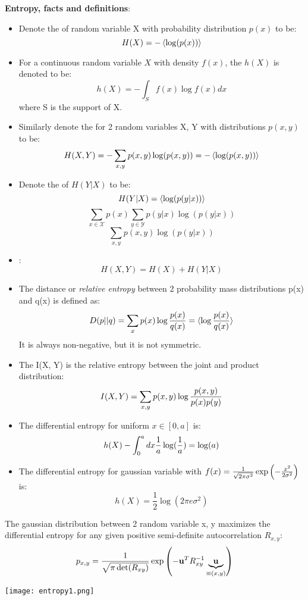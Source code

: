 \documentclass[11pt]{scrartcl}
\begin{document}
\textbf{Entropy, facts and definitions}:
\begin{itemize}
	\item Denote the  of random variable X with probability distribution $p(x)$ to be:
	\[ H(X) = - \braket{ \log (p(x)) } \]
	\item For a continuous random variable $X$ with density $f(x)$, the  $h(X)$ is denoted to be:
	\[h(X) = - \int_S f(x) \log f(x) dx \]
	where S is the support of X.
	\item Similarly denote the  for 2 random variables X, Y with distributions $p(x, y)$ to be:
    \[ H(X, Y) = -\sum_{x, y} p(x, y) \log(p(x, y)) = - \braket{ \log(p(x, y)) } \]
	\item  Denote the  of $H(Y | X)$ to be:
	\[ H(Y| X) = \braket{ \log( p(y|x)) } \]
	\[ \sum_{x \in \mathcal{X}} p(x) \sum_{y \in \mathcal{Y}} p(y|x) \log(p(y | x)) \]
	\[ \sum_{x, y} p(x, y) \log(p(y|x)) \]
	\item {}:
	\[H(X, Y) = H(X) + H(Y|X) \]
	\item The  distance or \emph{relative entropy} between 2 probability mass distributions p(x) and q(x) is defined as:
	\[D(p || q) = \sum_x p(x) \log {p(x) \over q(x)} = \braket{\log {p(x) \over q(x)}} \]
	It is always non-negative, but it is not symmetric.
	\item  The  I(X, Y) is the relative entropy between the joint and product distribution:
	\[ I(X, Y) = \sum_{x, y} p(x, y) \log {p(x, y) \over p(x) p(y)} \]
	\end{itemize}

\begin{example}
	\begin{itemize}
		\item The differential entropy for uniform $x \in [0, a]$ is:
		\[h(X) - \int_0^a  dx {1 \over a} \log({1 \over a}) = \log(a) \]
		\item The differential entropy for gaussian variable with 
		$f(x) = {1 \over \sqrt{2 \pi \sigma^2}} \exp \left( -{x^2 \over 2 \sigma^2}\right)$ is:
		\[h(X) = \frac12 \log (2 \pi e \sigma^2)\]
		\end{itemize}
	\end{example}
\begin{lemma}
	The gaussian distribution between 2 random variable x, y maximizes the differential entropy for any given positive semi-definite autocorrelation $R_{x,y}$:
	\[ p_{x, y} = {1 \over \sqrt{\pi \det(R_{xy})} } \exp \left(- {\mathbf{u}}^T R_{xy}^{-1} \underbrace{\mathbf{u}}_{\equiv (x, y)} \right) \]
	\end{lemma}
\texttt{[image: entropy1.png]}
\end{document}
